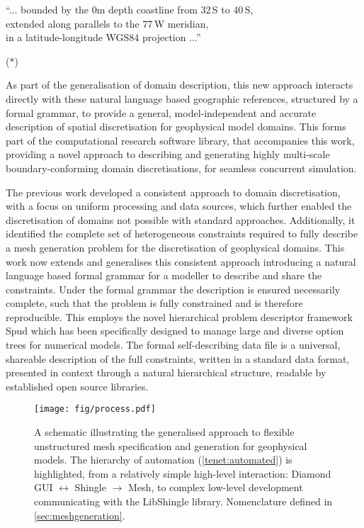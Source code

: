 \documentclass[a4paper, 10pt]{book}
\providecommand{\libshingle}{LibShingle\xspace}
\providecommand{\refdescriptionquote}{($\ast$)\xspace}
\newenvironment{descriptionquote}{%
    \setlength{\parskip}{4pt}
    \setlength{\parsep}{0pt}
    \medskip\par\noindent%
    \hspace{0.25\columnwidth}%
    \begin{minipage}{0.6\columnwidth}%
    \itshape%
  }{%
    \end{minipage}%
    \hfill\refdescriptionquote%
    \medskip\par\noindent%
    \ignorespacesafterend%
  }
\begin{document}
\begin{descriptionquote}
\hypertarget{description}{}
``... 
bounded by the 0m depth coastline from 32\,\degree S to 40\,\degree S,
\\[2pt]\phantom{``... \!}
extended along parallels to the 77\,\degree W meridian,
\\[2pt]\phantom{``... \!}
in a latitude-longitude WGS84 projection ...''
\label{description}
\end{descriptionquote}


As part of the generalisation of domain description, this new approach interacts directly with these natural language based
geographic
references,
structured by a formal grammar,
to provide a general, model-independent and accurate description of spatial discretisation for geophysical model domains.
%
This forms part of the \cite{shingle} computational research software library, that accompanies this work, providing a novel approach to describing and generating highly multi-scale boundary-conforming domain discretisations, for seamless concurrent simulation.

The previous work \cite{candybrep}
developed a consistent approach to domain discretisation, 
with a focus on uniform processing and data sources, which further enabled the discretisation of domains not possible with standard approaches.
%
Additionally, it identified the complete set of heterogeneous constraints required to fully describe a mesh generation problem for the discretisation of geophysical domains.
%
This work now extends and generalises this consistent approach introducing a natural language based formal grammar for a modeller to describe and share the constraints.
Under the formal grammar the description is ensured necessarily complete,
such that the problem is fully constrained and is therefore reproducible.
This employs the
novel hierarchical problem descriptor
framework
Spud \citep{ham09} which has been specifically designed to manage large and diverse option trees for numerical models.
%
The formal self-describing data file is a universal, shareable description of the full constraints, written in a standard data format, presented in context through a natural hierarchical structure, readable by established open source libraries.
%


%
\begin{figure}[!h]
\begin{center}
\texttt{[image: fig/process.pdf]}
\end{center}
\caption{%
A schematic illustrating the generalised approach to flexible unstructured mesh specification and generation for geophysical models.
%
The hierarchy of automation (\cref{tenet:automated}) is highlighted, from
a relatively simple high-level interaction:
{Diamond GUI $\leftrightarrow$ Shingle $\rightarrow$ Mesh},
to complex low-level development communicating with the \libshingle library.
Nomenclature defined in \cref{sec:meshgeneration}.
% 
}
\label{fig:process}
\end{figure}
%
\end{document}
